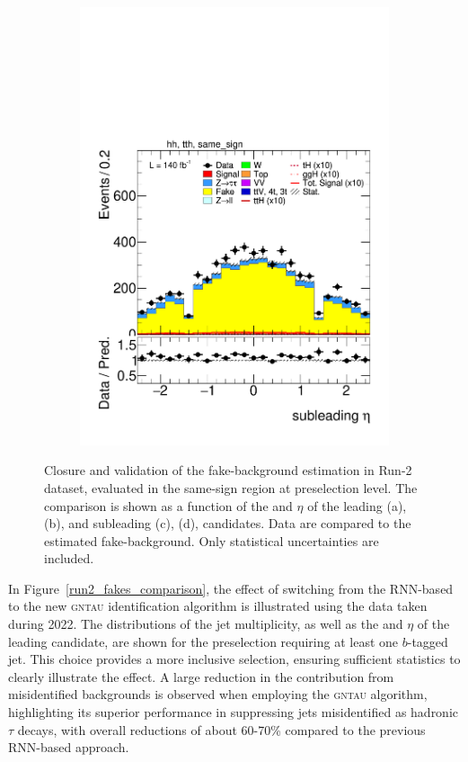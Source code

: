 \begin{figure}[htbp]
\begin{subfigure}[b]{0.45\textwidth}
      \includegraphics[width=\textwidth]{images/fakes_run2/plot_tau_1_eta_hh_tth_15_16_17_18_same_sign.pdf}
      \caption{}
    \end{subfigure}
  
    \caption{
      Closure and validation of the fake-\tauhad background estimation in Run-2 dataset, evaluated in the same-sign region at preselection level.
      The comparison is shown as a function of the \pt and $\eta$ of the leading (a), (b), and subleading (c), (d), \tauhad candidates. 
      Data are compared to the estimated fake-\tauhad background. Only statistical uncertainties are included.
    }
    \label{fig:closure_validation_run2}
  \end{figure}

  In Figure~\ref{run2_fakes_comparison}, the effect of switching from the RNN-based to the new \textsc{gntau} identification algorithm is illustrated using the data taken during 2022.
  The distributions of the jet multiplicity, as well as the \pt and $\eta$ of the leading \tauhad candidate, are shown for the preselection requiring at least one $b$-tagged jet.  
  This choice provides a more inclusive selection, ensuring sufficient statistics to clearly illustrate the effect.  
  A large reduction in the contribution from misidentified \tauhad backgrounds is observed when employing the \textsc{gntau} algorithm, highlighting its superior performance in suppressing jets misidentified as hadronic $\tau$ decays, with overall reductions of about 60-70\% compared to the previous RNN-based approach.
  
